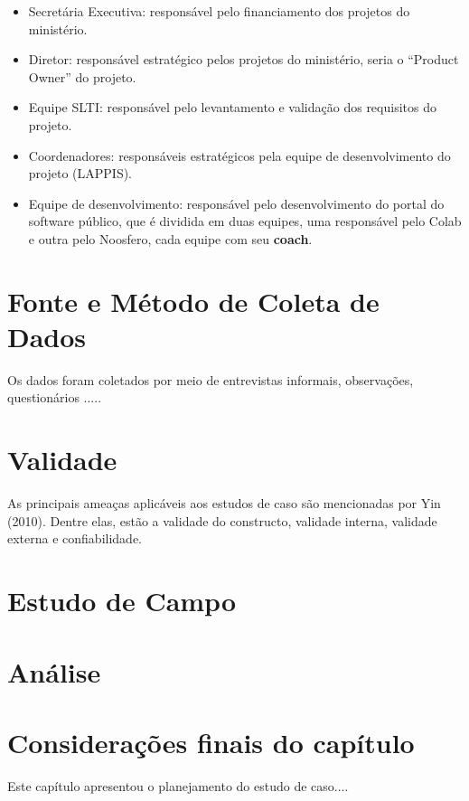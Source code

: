 \begin{itemize}

\item Secretária Executiva: responsável pelo financiamento dos projetos do ministério.

\item Diretor: responsável estratégico pelos projetos do ministério, seria o ``Product Owner'' do projeto.

\item Equipe SLTI: responsável pelo levantamento e validação dos requisitos do projeto.

\item Coordenadores: responsáveis estratégicos pela equipe de desenvolvimento do projeto (LAPPIS).

\item Equipe de desenvolvimento: responsável pelo desenvolvimento do portal do software público, que é dividida em duas equipes, uma responsável pelo Colab e outra pelo Noosfero, cada equipe com seu \textbf{coach}.

\end{itemize}

\section{Fonte e Método de Coleta de Dados}

Os dados foram coletados por meio de entrevistas informais, observações, questionários .....


\section{Validade}

As principais ameaças aplicáveis aos estudos de caso são mencionadas por Yin (2010). Dentre elas, estão a validade do constructo, validade interna, validade externa e confiabilidade. %

\section{Estudo de Campo}

\section{Análise}

\section{Considerações finais do capítulo}

Este capítulo apresentou o planejamento do estudo de caso....